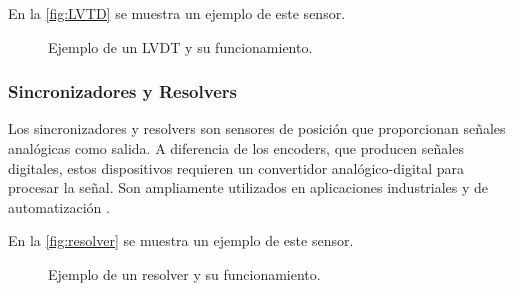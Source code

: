 En la \autoref{fig:LVTD} se muestra un ejemplo de este sensor.

\begin{figure}[h!]
	\centering
	\caption{Ejemplo de un LVDT y su funcionamiento.}
	\label{fig:LVTD}
\end{figure}

\subsubsection{Sincronizadores y Resolvers}
Los sincronizadores y resolvers son sensores de posición que proporcionan señales analógicas como salida. A diferencia de los encoders, que producen señales digitales, estos dispositivos requieren un convertidor analógico-digital para procesar la señal. Son ampliamente utilizados en aplicaciones industriales y de automatización \cite{Resolver}.

En la \autoref{fig:resolver} se muestra un ejemplo de este sensor.
\begin{figure}[h!]
	\centering
	\caption{Ejemplo de un resolver y su funcionamiento.}
	\label{fig:resolver}
\end{figure}

